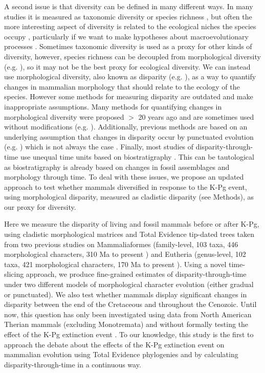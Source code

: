 \documentclass[12pt,letterpaper]{article}
\begin{document}
A second issue is that diversity can be defined in many different ways.
In many studies it is measured as taxonomic diversity or species richness \cite{Stadler12042011,meredithimpacts2011,OLeary08022013}, but often the more interesting aspect of diversity is related to the ecological niches the species occupy \cite{Brusatte12092008,toljagictriassic-jurassic2013}, particularly if we want to make hypotheses about macroevolutionary processes \cite{Losos2010,glor2010phylogenetic,benton2015}.
Sometimes taxonomic diversity is used as a proxy for other kinds of diversity, however, species richness can be decoupled from morphological diversity (e.g. \cite{slaterCetacean,ruta2013,hopkinsdecoupling2013}), so it may not be the best proxy for ecological diversity.
We can instead use morphological diversity, also known as disparity (e.g. \cite{Wills1994}), as a way to quantify changes in mammalian morphology that should relate to the ecology of the species.
However some methods for measuring disparity are outdated and make inappropriate assumptions.
Many methods for quantifying changes in morphological diversity were proposed $>$ 20 years ago \cite{Foote01071994,Wills1994} and are sometimes used without modifications (e.g. \cite{Brusatte12092008,thorneresetting2011,toljagictriassic-jurassic2013,ruta2013,bensonfaunal2014}).
Additionally, previous methods are based on an underlying assumption that changes in disparity occur by punctuated evolution (e.g. \cite{Brusatte12092008}) which is not always the case \cite{Hunt21042015}.
Finally, most studies of disparity-through-time use unequal time units based on biostratigraphy \cite{Brusatte12092008,toljagictriassic-jurassic2013}. 
This can be tautological as biostratigraphy is already based on changes in fossil assemblages and morphology through time.
To deal with these issues, we propose an updated approach to test whether mammals diversified in response to the K-Pg event, using morphological disparity, measured as cladistic disparity (see Methods), as our proxy for diversity.

Here we measure the disparity of living and fossil mammals before or after K-Pg, using cladistic morphological matrices and Total Evidence tip-dated trees taken from two previous studies on Mammaliaformes (family-level, 103 taxa, 446 morphological characters, 310 Ma to present \cite{Slater2012MEE}) and Eutheria (genus-level, 102 taxa, 421 morphological characters, 170 Ma to present \cite{beckancient2014}). 
Using a novel time-slicing approach, we produce fine-grained estimates of disparity-through-time under two different models of morphological character evolution (either gradual or punctuated). 
We also test whether mammals display significant changes in disparity between the end of the Cretaceous and throughout the Cenozoic.
Until now, this question has only been investigated using data from North American Therian mammals (excluding Monotremata) and without formally testing the effect of the K-Pg extinction event \cite{Wilson2013}.
To our knowledge, this study is the first to approach the debate about the effects of the K-Pg extinction event on mammalian evolution using Total Evidence phylogenies and by calculating disparity-through-time in a continuous way.
\end{document}
